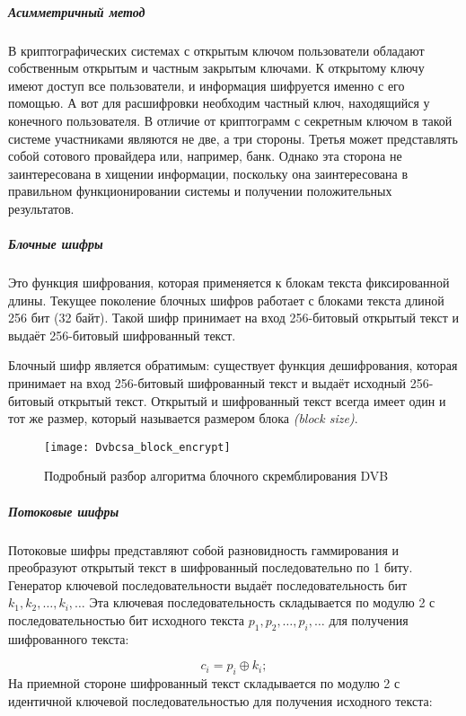 \subparagraph{Асимметричный метод}%
В криптографических системах с открытым ключом пользователи обладают
собственным открытым и частным закрытым ключами. К открытому ключу имеют
доступ все пользователи, и информация шифруется именно с его помощью. А вот
для расшифровки необходим частный ключ, находящийся у конечного пользователя.
В отличие от криптограмм с секретным ключом в такой системе участниками
являются не две, а три стороны. Третья может представлять собой сотового
провайдера или, например, банк. Однако эта сторона не заинтересована в
хищении информации, поскольку она заинтересована в правильном
функционировании системы и получении положительных результатов.

\subparagraph{Блочные шифры}%
%
%
Это функция шифрования, которая применяется к блокам текста фиксированной
длины. Текущее поколение блочных шифров работает с блоками текста длиной 256
бит (32 байт). Такой шифр принимает на вход 256-битовый открытый текст и
выдаёт 256-битовый шифрованный текст.

Блочный шифр является обратимым: существует функция дешифрования, которая
принимает на вход 256-битовый шифрованный текст и выдаёт исходный 256-битовый
открытый текст. Открытый и шифрованный текст всегда имеет один и тот же
размер, который называется размером блока \emph{(block size)}.

\begin{figure}[!ht]
  \centering
  \texttt{[image: Dvbcsa\_block\_encrypt]}
  \caption{Подробный разбор алгоритма блочного скремблирования DVB }\label{Dvbcsa_block}
\end{figure}

\subparagraph{Потоковые шифры}%
Потоковые шифры представляют собой разновидность гаммирования и преобразуют
открытый текст в шифрованный последовательно по 1 биту. Генератор ключевой
последовательности выдаёт последовательность бит $k_1,k_2, \ldots,k_i, \ldots
$ Эта ключевая последовательность складывается по модулю 2 с
последовательностью бит исходного текста $p_1,p_2, \ldots,p_i, \ldots $ для
получения шифрованного текста:

\begin{equation}\label{potocShifr}
c_i=p_i \oplus k_i;
\end{equation}
На приемной стороне шифрованный текст складывается по мо­дулю 2 с идентичной
ключевой последовательностью для получения исходного текста:

